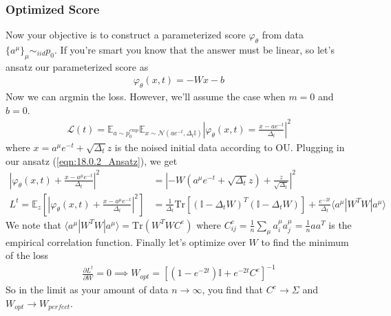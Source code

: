 \subsubsection{Optimized Score}
Now your objective is to construct a parameterized score $\varphi_\theta$ from data $\{a^\mu\}_\mu \sim_{iid} p_0$. If you're smart you know that the answer must be linear, so let's ansatz our parameterized score as
\begin{align}
	\varphi_\theta(x,t) = - W x - b \label{eqn:18.0.2_Ansatz}
\end{align}
Now we can argmin the loss. However, we'll assume the case when $m = 0$ and $b=0$.
\begin{align}
	\mathcal L(t) = \mathbb E_{a \sim p_0^{emp}} \mathbb E_{x \sim \mathcal N(a e^{-t} , \Delta_t \mathbb I)} | \varphi_\theta(x,t) = \frac{x - a e^{-t}}{\Delta_t}|^2
\end{align}
where $x = a^\mu e^{-t} + \sqrt{\Delta_t} z$ is the noised initial data according to OU. Plugging in our ansatz (\ref{eqn:18.0.2_Ansatz}), we get
\begin{align}
	|\varphi_\theta(x,t) + \frac{x- a^\mu e^{-t}}{\Delta_t}|^2 & = |- W (a^\mu e^{-t} + \sqrt{\Delta_t} z) + \frac{z}{\sqrt{\Delta_t}}|^2\\
	L^t = \mathbb E_z [|\varphi_\theta(x,t) + \frac{x- a^\mu e^{-t}}{\Delta_t}|^2] & =  \frac{1}{\Delta_t} \text{Tr}[(\mathbb I - \Delta_t W)^T (\mathbb I - \Delta_t W)]  + \frac{e^{-2t}}{\Delta_t} \langle a^\mu | W^T W | a^\mu\rangle
\end{align}
We note that $\langle a^\mu |W^T W | a^\mu\rangle = \text{Tr} (W^T W C^e)$ where $C^e_{ij} = \frac{1}{n} \sum_\mu a_i^\mu a_j^\mu = \frac{1}{n} aa^T$ is the empirical correlation function. Finally let's optimize over $W$ to find the minimum of the loss
\begin{align}
	\frac{\partial L^t}{\partial W} = 0 \implies W_{opt} = [(1 - e^{-2t}) \mathbb I + e^{-2t} C^e]^{-1}	
\end{align}
So in the limit as your amount of data $n \to \infty$, you find that $C^e \to \Sigma$ and $W_{opt} \to W_{perfect}$.
